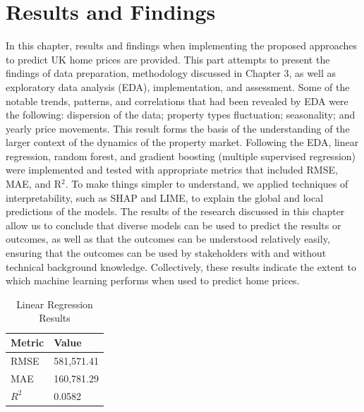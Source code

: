 \documentclass[12pt, a4paper, oneside]{book}
\begin{document}
\chapter{Results and Findings}\label{ch:4}

In this chapter, results and findings when implementing the proposed approaches to predict UK home prices are provided. This part attempts to present the findings of data preparation, methodology discussed in Chapter 3, as well as exploratory data analysis (EDA), implementation, and assessment. Some of the notable trends, patterns, and correlations that had been revealed by EDA were the following: dispersion of the data; property types fluctuation; seasonality; and yearly price movements. This result forms the basis of the understanding of the larger context of the dynamics of the property market. Following the EDA, linear regression, random forest, and gradient boosting (multiple supervised regression) were implemented and tested with appropriate metrics that included RMSE, MAE, and R$^2$. To make things simpler to understand, we applied techniques of interpretability, such as SHAP and LIME, to explain the global and local predictions of the models. The results of the research discussed in this chapter allow us to conclude that diverse models can be used to predict the results or outcomes, as well as that the outcomes can be understood relatively easily, ensuring that the outcomes can be used by stakeholders with and without technical background knowledge. Collectively, these results indicate the extent to which machine learning performs when used to predict home prices.

\textbf{}


\textbf{}



\begin{table}[htbp]
\centering
\caption{Linear Regression Results}
\label{tab:linear_regression_results}
\begin{tabular}{|p{4cm}|p{4cm}|}
\hline
\textbf{Metric} & \textbf{Value} \\
\hline
RMSE & 581,571.41 \\
\hline
MAE & 160,781.29 \\
\hline
$R^2$ & 0.0582 \\
\hline
\end{tabular}
\end{table}


\textbf{}


\textbf{}
\end{document}
